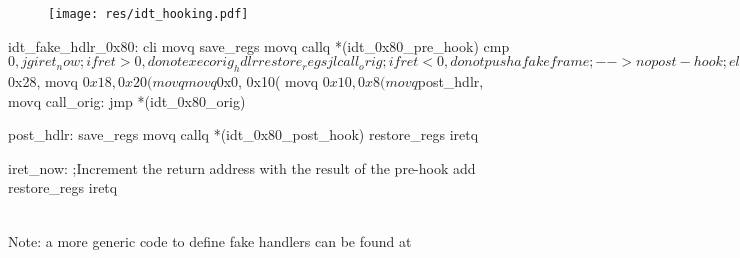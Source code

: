 \begin{figure}[h]
  \centering
  \texttt{[image: res/idt\_hooking.pdf]}
\end{figure}

\begin{asmcode}
idt_fake_hdlr_0x80:
  cli
  movq %
  save_regs
  movq %
  callq *(idt_0x80_pre_hook)
  cmp $0, %
  jg iret_now                             ;if ret > 0, do not exec orig_hdlr
  restore_regs
  jl call_orig                            ;if ret < 0, do not push a fake frame
                                          ;  --> no post-hook
                                          ;else push a fake frame
  sub $0x28, %
  movq $0x18, 0x20(%
  movq %
  movq $0x0, 0x10(%
  movq $0x10, 0x8(%
  movq $post_hdlr, %
  movq %
  call_orig:
  jmp *(idt_0x80_orig)

post_hdlr:
  save_regs
  movq %
  callq *(idt_0x80_post_hook)
  restore_regs
  iretq

iret_now:
  ;Increment the return address with the result of the pre-hook
  add %
  restore_regs
  iretq
\end{asmcode}
\\
Note: a more generic code to define fake handlers can be found at
